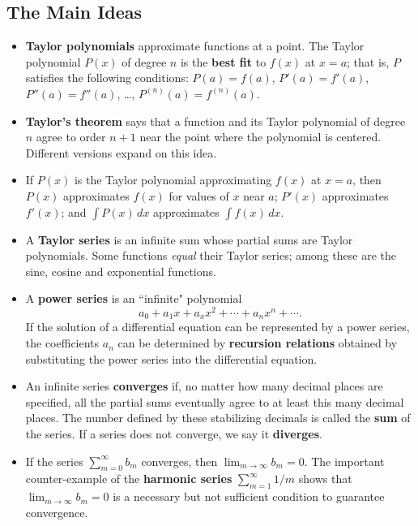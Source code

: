 \subsection{The Main Ideas}
\label{subsec:the-main-ideas}

\begin{itemize}

\item {\bf Taylor polynomials} approximate functions at a point.  The
  Taylor polynomial $P(x)$ of degree $n$ is the {\bf best fit} to
  $f(x)$ at $x=a$; that is, $P$ satisfies the following conditions:
  $P(a)=f(a)$, $P'(a)=f'(a)$, $P''(a)=f''(a)$, \ldots ,
  $P^{(n)}(a)=f^{(n)}(a)$.

\item {\bf Taylor's theorem} says that a function and its Taylor
  polynomial of degree $n$ agree to order $n + 1$ near the point where
  the polynomial is centered.  Different versions expand on this idea.

\item If $P(x)$ is the Taylor polynomial approximating $f(x)$ at
  $x=a$, then $P(x)$ approximates $f(x)$ for values of $x$ near $a$;
  $P'(x)$ approximates $f'(x)$; and $\int \! P(x) \, dx$ approximates
  $\int \! f(x) \, dx$.

\item A {\bf Taylor series} is an infinite sum whose partial sums are
  Taylor polynomials.  Some functions {\em equal} their Taylor series;
  among these are the sine, cosine and exponential functions.

\item  A {\bf power series} is an ``infinite" polynomial
\[
a_0 + a_1x + a_x x^2 + \cdots + a_n x^n + \cdots .
\]  
If the solution of a differential equation can be represented by a
power series, the coefficients $a_n$ can be determined by {\bf
  recursion relations} obtained by substituting the power series into
the differential equation.


\item An infinite series {\bf converges} if, no matter how many
  decimal places are specified, all the partial sums eventually agree
  to at least this many decimal places.  The number defined by these
  stabilizing decimals is called the {\bf sum} of the series.  If a
  series does not converge, we say it {\bf diverges}.

\item If the series $\sum_{m=0}^\infty b_m$ converges, then $\lim_{m
  \to \infty} b_m=0$.  The important counter-example of the {\bf
  harmonic series} $\sum_{m=1}^{\infty} 1/m$ shows that $\lim_{m \to
  \infty} b_m = 0$ is a necessary but not sufficient condition to
  guarantee convergence.


\end{itemize}
